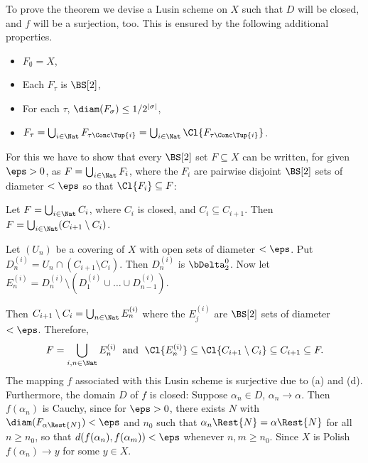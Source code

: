\documentclass[letterpaper,10pt,english]{jupyterBook}
\begin{document}
\sphinxAtStartPar
To prove the theorem we devise a Lusin scheme on \(X\) such that \(D\) will be closed, and \(f\) will be a surjection, too. This is ensured by the following additional properties.
\begin{itemize}
\item {} 
\sphinxAtStartPar
{} \(F_\emptyset = X\),

\item {} 
\sphinxAtStartPar
{} Each \(F_\tau\) is \(\BS[2]\),

\item {} 
\sphinxAtStartPar
{} For each \(\tau\), \(\diam(F_\sigma) \leq 1/2^{|\sigma|}\),

\item {} 
\sphinxAtStartPar
{} \(F_\tau = \bigcup_{i \in \Nat} F_{\tau\Conc \Tup{i}} =  \bigcup_{i \in \Nat} \Cl{F_{\tau\Conc \Tup{i}}}\).

\end{itemize}

\sphinxAtStartPar
For this we have to show that every \(\BS[2]\) set \(F \subseteq X\) can be written, for given \(\eps > 0\), as  \(F= \bigcup_{i \in \Nat} F_i\), where the \(F_i\) are pairwise disjoint \(\BS[2]\) sets of diameter \(< \eps\) so that \(\Cl{F_i} \subseteq F\):

\sphinxAtStartPar
Let \(F= \bigcup_{i \in \Nat} C_i\), where \(C_i\) is closed, and \(C_i \subseteq C_{i+1}\). Then \(F= \bigcup_{i \in \Nat}(C_{i+1} \setminus C_i)\).

\sphinxAtStartPar
Let \((U_n)\) be a covering of \(X\) with open sets of diameter \(< \eps\). Put \(D^{(i)}_n = U_n \cap (C_{i+1} \setminus C_i)\). Then \(D^{(i)}_n\) is \(\bDelta^0_2\). Now let \(E^{(i)}_n = D^{(i)}_n \setminus (D^{(i)}_1 \cup \dots \cup D^{(i)}_{n-1})\).

\sphinxAtStartPar
Then \(C_{i+1} \setminus C_i = \bigcup_{n \in \Nat} E^{(i)}_n\) where the \(E^{(i)}_j\) are \(\BS[2]\) sets of diameter \(<\eps\). Therefore,
\begin{equation*}
F =  \bigcup_{i,n\in \Nat} E^{(i)}_n \; \text{ and } \;  \Cl{E^{(i)}_n} \subseteq \Cl{C_{i+1} \setminus C_i} \subseteq C_{i+1} \subseteq F.
\end{equation*}
\sphinxAtStartPar
The mapping \(f\) associated with this Lusin scheme is surjective due to (a) and (d).
Furthermore, the domain \(D\) of \(f\) is closed: Suppose \(\alpha_n \in D\), \(\alpha_n \to \alpha\). Then \(f(\alpha_n)\) is Cauchy, since for \(\eps > 0\), there exists \(N\) with \(\diam(F_{\alpha\Rest{N}}) < \eps\) and \(n_0\) such that \(\alpha_n\Rest{N} = \alpha\Rest{N}\) for all \(n \geq n_0\), so that \(d(f(\alpha_n),f(\alpha_m)) < \eps\) whenever \(n,m \geq n_0\). Since \(X\) is Polish \(f(\alpha_n) \to y\) for some \(y \in X\).
\end{document}
